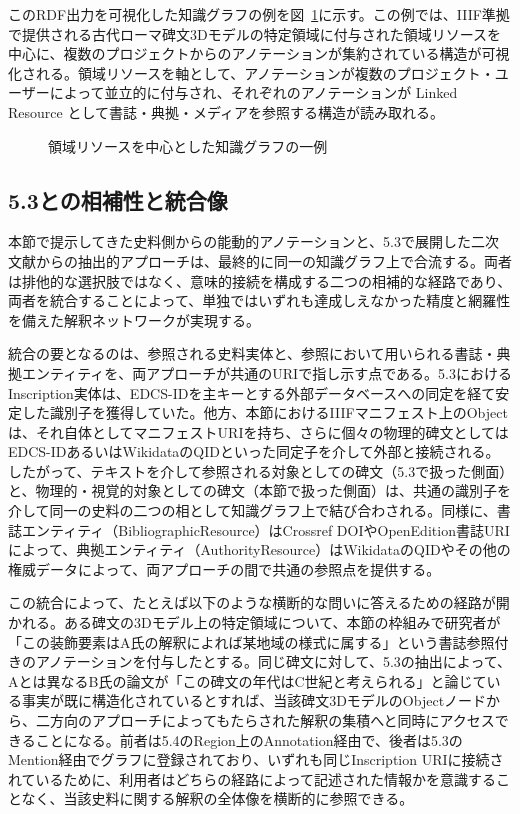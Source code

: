 このRDF出力を可視化した知識グラフの例を図~\ref{fig:ch5-knowledge-graph}に示す。この例では、IIIF準拠で提供される古代ローマ碑文3Dモデルの特定領域に付与された領域リソースを中心に、複数のプロジェクトからのアノテーションが集約されている構造が可視化される。領域リソースを軸として、アノテーションが複数のプロジェクト・ユーザーによって並立的に付与され、それぞれのアノテーションが Linked Resource として書誌・典拠・メディアを参照する構造が読み取れる。

\begin{figure}[htbp]
  \centering
  \caption{領域リソースを中心とした知識グラフの一例}
  \label{fig:ch5-knowledge-graph}
\end{figure}

\subsection{5.3との相補性と統合像}

本節で提示してきた史料側からの能動的アノテーションと、5.3で展開した二次文献からの抽出的アプローチは、最終的に同一の知識グラフ上で合流する。両者は排他的な選択肢ではなく、意味的接続を構成する二つの相補的な経路であり、両者を統合することによって、単独ではいずれも達成しえなかった精度と網羅性を備えた解釈ネットワークが実現する。

統合の要となるのは、参照される史料実体と、参照において用いられる書誌・典拠エンティティを、両アプローチが共通のURIで指し示す点である。5.3におけるInscription実体は、EDCS-IDを主キーとする外部データベースへの同定を経て安定した識別子を獲得していた。他方、本節におけるIIIFマニフェスト上のObjectは、それ自体としてマニフェストURIを持ち、さらに個々の物理的碑文としてはEDCS-IDあるいはWikidataのQIDといった同定子を介して外部と接続される。したがって、テキストを介して参照される対象としての碑文（5.3で扱った側面）と、物理的・視覚的対象としての碑文（本節で扱った側面）は、共通の識別子を介して同一の史料の二つの相として知識グラフ上で結び合わされる。同様に、書誌エンティティ（BibliographicResource）はCrossref DOIやOpenEdition書誌URIによって、典拠エンティティ（AuthorityResource）はWikidataのQIDやその他の権威データによって、両アプローチの間で共通の参照点を提供する。

この統合によって、たとえば以下のような横断的な問いに答えるための経路が開かれる。ある碑文の3Dモデル上の特定領域について、本節の枠組みで研究者が「この装飾要素はA氏の解釈によれば某地域の様式に属する」という書誌参照付きのアノテーションを付与したとする。同じ碑文に対して、5.3の抽出によって、Aとは異なるB氏の論文が「この碑文の年代はC世紀と考えられる」と論じている事実が既に構造化されているとすれば、当該碑文3DモデルのObjectノードから、二方向のアプローチによってもたらされた解釈の集積へと同時にアクセスできることになる。前者は5.4のRegion上のAnnotation経由で、後者は5.3のMention経由でグラフに登録されており、いずれも同じInscription URIに接続されているために、利用者はどちらの経路によって記述された情報かを意識することなく、当該史料に関する解釈の全体像を横断的に参照できる。

